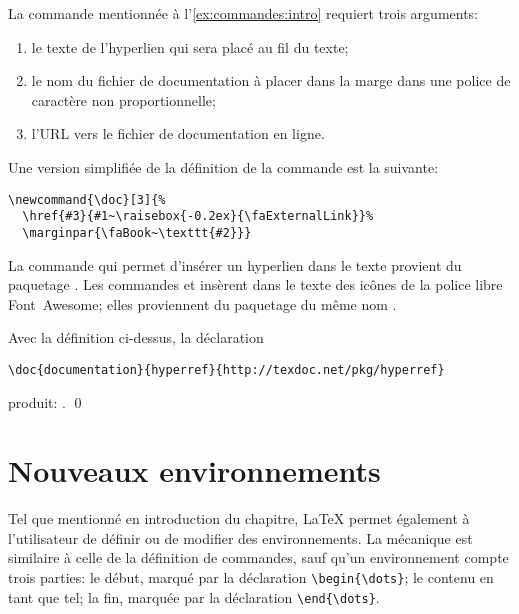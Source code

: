 \begin{exemple}
  La commande \cmdprint{\doc} mentionnée à
  l'\autoref{ex:commandes:intro} requiert trois arguments:
  \begin{enumerate}
  \item le texte de l'hyperlien qui sera placé au fil du texte;
  \item le nom du fichier de documentation à placer dans la marge dans
    une police de caractère non proportionnelle;
  \item l'URL vers le fichier de documentation en ligne.
  \end{enumerate}
  Une version simplifiée de la définition de la commande est la
  suivante:
\begin{lstlisting}
\newcommand{\doc}[3]{%
  \href{#3}{#1~\raisebox{-0.2ex}{\faExternalLink}}%
  \marginpar{\faBook~\texttt{#2}}}
\end{lstlisting}
  La commande \cmd{\href} qui permet d'insérer un hyperlien dans le
  texte provient du paquetage  \citep{hyperref}. Les
  commandes \cmdprint{\faExternalLink} et \cmdprint{\faBook}
  insèrent dans le texte des icônes de la police libre Font~Awesome;
  elles proviennent du paquetage du même nom \citep{fontawesome}.

  Avec la définition ci-dessus, la déclaration
\begin{lstlisting}
\doc{documentation}{hyperref}{http://texdoc.net/pkg/hyperref}
\end{lstlisting}
  produit: . %
  \qed
\end{exemple}


\section{Nouveaux environnements}
\label{sec:commandes:environnements}

Tel que mentionné en introduction du chapitre, {\LaTeX} permet
également à l'utilisateur de définir ou de modifier des
environnements. La mécanique est similaire à celle de la définition de
commandes, sauf qu'un environnement compte trois parties: le début,
marqué par la déclaration \verb=\begin{\dots}=; le contenu en tant que
  tel; la fin, marquée par la déclaration \verb=\end{\dots}=.

